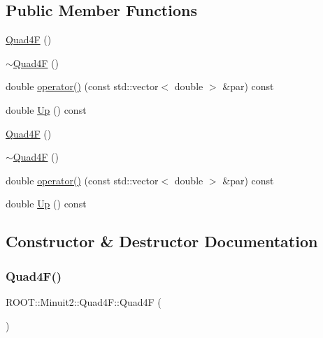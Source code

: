 \subsection*{Public Member Functions}
\begin{DoxyCompactItemize}
\item 
\mbox{\hyperlink{classROOT_1_1Minuit2_1_1Quad4F_a419218c0cf1b6dde24c0fbc44d30b68c}{Quad4F}} ()
\item 
\mbox{\hyperlink{classROOT_1_1Minuit2_1_1Quad4F_a93ee61442fd15112effb14f416e296ce}{$\sim$\+Quad4F}} ()
\item 
double \mbox{\hyperlink{classROOT_1_1Minuit2_1_1Quad4F_a41964a71fa65445e18c041fbdc724a03}{operator()}} (const std\+::vector$<$ double $>$ \&par) const
\item 
double \mbox{\hyperlink{classROOT_1_1Minuit2_1_1Quad4F_a19ebb5413722895a7635626cca02ebe9}{Up}} () const
\item 
\mbox{\hyperlink{classROOT_1_1Minuit2_1_1Quad4F_a419218c0cf1b6dde24c0fbc44d30b68c}{Quad4F}} ()
\item 
\mbox{\hyperlink{classROOT_1_1Minuit2_1_1Quad4F_a93ee61442fd15112effb14f416e296ce}{$\sim$\+Quad4F}} ()
\item 
double \mbox{\hyperlink{classROOT_1_1Minuit2_1_1Quad4F_a41964a71fa65445e18c041fbdc724a03}{operator()}} (const std\+::vector$<$ double $>$ \&par) const
\item 
double \mbox{\hyperlink{classROOT_1_1Minuit2_1_1Quad4F_a19ebb5413722895a7635626cca02ebe9}{Up}} () const
\end{DoxyCompactItemize}


\subsection{Constructor \& Destructor Documentation}
\mbox{\label{classROOT_1_1Minuit2_1_1Quad4F_a419218c0cf1b6dde24c0fbc44d30b68c}} 
\subsubsection{\texorpdfstring{Quad4F()}{Quad4F()}\hspace{0.1cm}{\footnotesize\ttfamily [1/2]}}
{\footnotesize\ttfamily R\+O\+O\+T\+::\+Minuit2\+::\+Quad4\+F\+::\+Quad4F (\begin{DoxyParamCaption}{ }\end{DoxyParamCaption})\hspace{0.3cm}{\ttfamily [inline]}}

